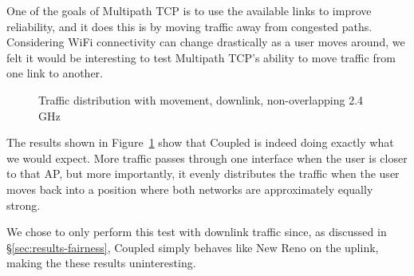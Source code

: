 One of the goals of Multipath TCP is to use the available links to improve
reliability, and it does this is by moving traffic away from congested
paths. Considering WiFi connectivity can change drastically as a user moves around,
we felt it would be interesting to test Multipath TCP's ability to move traffic
from one link to another.

\begin{figure}[h]
 \centering
 
 \caption{Traffic distribution with movement, downlink, non-overlapping 2.4 GHz}\label{graph:mobility}
\end{figure}

The results shown in
Figure~\ref{graph:mobility} show that Coupled is indeed doing exactly what
we would expect. More traffic passes through one interface when the user is
closer to that AP, but more importantly, it evenly distributes the
traffic when the user moves back into a position where both networks are
approximately equally strong.

We chose to only perform this test with downlink traffic since, as discussed in
\S\ref{sec:results-fairness}, Coupled simply behaves like New Reno on the uplink,
making the these results uninteresting.

